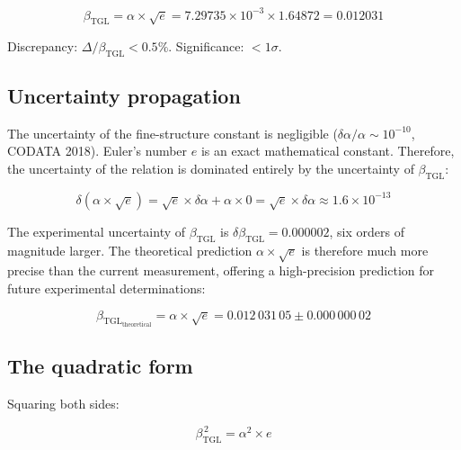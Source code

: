 \documentclass[12pt,a4paper,twoside]{article}
\newcommand{\betatgl}{\beta_{\!\scriptscriptstyle\mathrm{TGL}}}
\begin{document}
\begin{resultbox}[title={Central Result}]
\begin{equation}
\betatgl = \alpha \times \sqrt{e} = 7.29735 \times 10^{-3} \times 1.64872 = 0.012031
\label{eq:resultado_central}
\end{equation}

\noindent Discrepancy: $\Delta/\betatgl < 0.5\%$. Significance: $< 1\sigma$.
\end{resultbox}

\subsection{Uncertainty propagation}

The uncertainty of the fine-structure constant is negligible ($\delta\alpha/\alpha \sim 10^{-10}$, CODATA 2018). Euler's number $e$ is an exact mathematical constant. Therefore, the uncertainty of the relation is dominated entirely by the uncertainty of $\betatgl$:

\begin{equation}
\delta(\alpha \times \sqrt{e}) = \sqrt{e} \times \delta\alpha + \alpha \times 0 = \sqrt{e} \times \delta\alpha \approx 1.6 \times 10^{-13}
\end{equation}

The experimental uncertainty of $\betatgl$ is $\delta\betatgl = 0.000002$, six orders of magnitude larger. The theoretical prediction $\alpha \times \sqrt{e}$ is therefore much more precise than the current measurement, offering a high-precision prediction for future experimental determinations:

\begin{equation}
\betatgl_{\text{theoretical}} = \alpha \times \sqrt{e} = 0.012\,031\,05 \pm 0.000\,000\,02
\label{eq:previsao}
\end{equation}

\subsection{The quadratic form}

Squaring both sides:

\begin{equationbox}[title={Quadratic Form}]
\begin{equation}
\boxed{\betatgl^{\,2} = \alpha^2 \times e}
\label{eq:quadratica}
\end{equation}
\end{equationbox}
\end{document}
